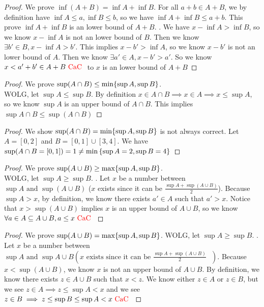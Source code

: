 \documentclass{report}
\begin{document}
\begin{proof}
We prove $\inf (A+B)= \inf A +\inf B$. For all $a+b \in A+B$, we by definition have $\inf A\leq a,\inf B\leq b$, so we have $\inf A+\inf B\leq a+b$. This prove $\inf A+ \inf B$ is an lower bound of $A+B$.  . We have $x- \inf A > \inf B$, so we know $x - \inf A$ is not an lower bound of $B$. Then we know  $\exists b' \in B, x- \inf A > b'$. This implies $x-b'>\inf A$, so we know $x- b'$ is not an lower bound of $A$. Then we know  $\exists a' \in A, x-b'>a'$. So we know $x<a'+b' \in A+B\text{ \textcolor{red}{CaC} }$ to $x$ is an lower bound of $A+B$ 
\end{proof}
\begin{proof}
We prove $\sup (A\cap B)\leq \min \{ \sup A,\sup  B \}$.\\

WOLG, let $\sup A\leq \sup B$. By definition $x \in A\cap B \implies  x \in A \implies x\leq \sup A$, so we know $\sup A$ is an upper bound of $A\cap B$. This implies $\sup A\cap B\leq \sup (A\cap B)$ 
\end{proof}
\begin{proof}
We show $\sup (A\cap B)= \min \{ \sup A,\sup B \}$ is not always correct. Let $A=[0,2]$ and $B=[0,1]\cup [3,4]$. We have $\sup (A\cap B= [0,1])=1\neq \min{\{ \sup A=2,\sup B=4 \}}$
\end{proof}
\begin{proof}
We prove $\sup (A\cup B)\geq \max \{ \sup A, \sup B \}$.\\

WOLG, let $\sup A\geq \sup B$. . Let $x$ be a number between  $\sup A\text{ and }\sup (A\cup B)$ ($x$ exists since it can be  $\frac{\sup A+\sup (A\cup B)}{2}$). Because $\sup A>x$, by definition, we know there exists $a' \in A$ such that $a'>x$. Notice that $x> \sup (A\cup B)$ implies $x$ is an upper bound of $A \cup B$, so we know $\forall a \in A\subseteq A\cup B, a\leq x\text{ \textcolor{red}{CaC} }$
\end{proof}
\begin{proof}
We prove $\sup (A\cup B)=\max \{ \sup A,\sup B \}$. WOLG, let $\sup A\geq \sup B$. . Let $x$ be a number between  $\sup A\text{ and }\sup A\cup B(x\text{ exists since it can be $\frac{\sup A+\sup (A\cup B)}{2}$ })$. Because $x<\sup (A\cup B)$, we know $x$ is not an upper bound of  $A\cup B$. By definition, we know there exists $z\in A\cup B$ such that $x<z$. We know either $z \in A$ or $z \in B$, but we see $z \in A\implies z\leq \sup A<x$ and we see $z \in B\implies z\leq \sup B\leq \sup A<x\text{ \textcolor{red}{CaC} }$
\end{proof}
\end{document}
